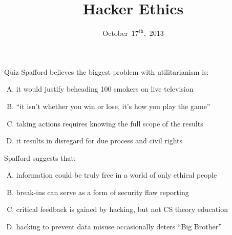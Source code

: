 \documentclass{beamer}
\title{Hacker Ethics}
\date{October~$17^{\text{th}}$,~2013}
\begin{document}
\begin{frame}
\titlepage
\end{frame}

\begin{frame}{Quiz}
Spafford believes the biggest problem with utilitarianism is:
\begin{enumerate}[(A)]
\item<1> it would justify beheading 100 smokers on live television
\item<1> ``it isn't whether you win or lose, it's how you play the game''
\item<1-2> taking actions requires knowing the full scope of the results
\item<1> it results in disregard for due process and civil rights
\end{enumerate}
\bigskip
Spafford suggests that:
\begin{enumerate}[(A)]
\item<1-2> information could be truly free in a world of only ethical people
\item<1> break-ins can serve as a form of security flaw reporting %
\item<1> critical feedback is gained by hacking, but not CS theory education %
\item<1> hacking to prevent data misuse occasionally deters ``Big Brother''
\end{enumerate}
\end{frame}
\end{document}
